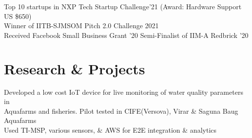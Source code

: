 \documentclass[]{deedy-resume-openfont}
\begin{document}
\begin{minipage}[t]{0.66\textwidth}
{\hspace{2mm} \textbullet{} Top 10 startups in NXP Tech Startup Challenge'21 (Award: Hardware Support US \$650)\\
\hspace{2mm} \textbullet{} Winner of IITB-SJMSOM Pitch 2.0 Challenge 2021\\
\hspace{2mm} \textbullet{} Received Facebook Small Business Grant '20 \textbullet{} Semi-Finalist of IIM-A Redbrick ’20\\
}
\sectionsep



\section{Research \& Projects}
\small {
\hspace{2mm} \textbullet{} Developed a low cost IoT device for live monitoring of water  quality parameters in\\
\hspace{5mm} Aquafarms and fisheries. Pilot tested in CIFE(Versova), Virar \& Saguna Baug Aquafarms\\
\hspace{2mm} \textbullet{} Used TI-MSP, various sensors, \& AWS for E2E integration \& analytics
}


\end{minipage}
\end{document}
